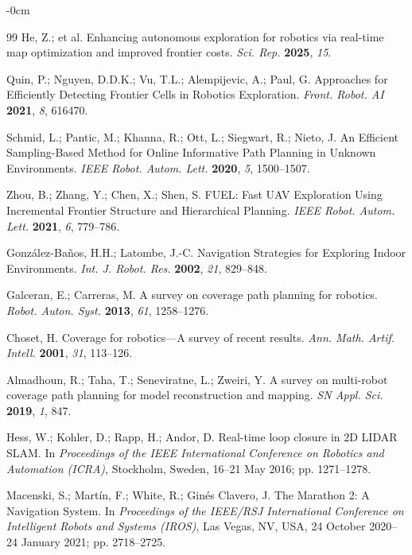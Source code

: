 \documentclass[sensors,article,submit,pdftex,moreauthors]{Definitions/mdpi}
\providecommand{\DIFadd}[1]{{\protect\color{blue} \sf #1}} %
\providecommand{\DIFaddbegin}{} %
\providecommand{\DIFaddend}{} %
\begin{document}
\begin{adjustwidth}{-\extralength}{0cm}
\begin{thebibliography}{99}
He, Z.; et al. Enhancing autonomous exploration for robotics via real-time map optimization and improved frontier costs. \textit{Sci. Rep.} \textbf{2025}, \textit{15}.

Quin, P.; Nguyen, D.D.K.; Vu, T.L.; Alempijevic, A.; Paul, G. Approaches for Efficiently Detecting Frontier Cells in Robotics Exploration. \textit{Front. Robot. AI} \textbf{2021}, \textit{8}, 616470.

\DIFaddbegin {}
\DIFadd{Schmid, L.; Pantic, M.; Khanna, R.; Ott, L.; Siegwart, R.; Nieto, J. An Efficient Sampling-Based Method for Online Informative Path Planning in Unknown Environments. \textit{IEEE Robot. Autom. Lett.} \textbf{2020}, \textit{5}, 1500--1507.
}

\DIFadd{Zhou, B.; Zhang, Y.; Chen, X.; Shen, S. FUEL: Fast UAV Exploration Using Incremental Frontier Structure and Hierarchical Planning. \textit{IEEE Robot. Autom. Lett.} \textbf{2021}, \textit{6}, 779--786.
}

\DIFaddend {}
Gonz\'alez-Ba\~nos, H.H.; Latombe, J.-C. Navigation Strategies for Exploring Indoor Environments. \textit{Int. J. Robot. Res.} \textbf{2002}, \textit{21}, 829--848.

Galceran, E.; Carreras, M. A survey on coverage path planning for robotics. \textit{Robot. Auton. Syst.} \textbf{2013}, \textit{61}, 1258--1276.

Choset, H. Coverage for robotics---A survey of recent results. \textit{Ann. Math. Artif. Intell.} \textbf{2001}, \textit{31}, 113--126.

Almadhoun, R.; Taha, T.; Seneviratne, L.; Zweiri, Y. A survey on multi-robot coverage path planning for model reconstruction and mapping. \textit{SN Appl. Sci.} \textbf{2019}, \textit{1}, 847.

Hess, W.; Kohler, D.; Rapp, H.; Andor, D. Real-time loop closure in 2D LIDAR SLAM. In \textit{Proceedings of the IEEE International Conference on Robotics and Automation (ICRA)}, Stockholm, Sweden, 16--21 May 2016; pp. 1271--1278.

Macenski, S.; Mart\'in, F.; White, R.; Gin\'es Clavero, J. The Marathon 2: A Navigation System. In \textit{Proceedings of the IEEE/RSJ International Conference on Intelligent Robots and Systems (IROS)}, Las Vegas, NV, USA, 24 October 2020--24 January 2021; pp. 2718--2725.


\end{thebibliography}
\end{adjustwidth}
\end{document}
